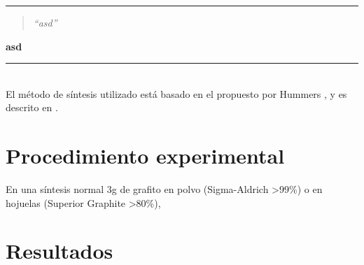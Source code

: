\noindent
\rule{\linewidth}{1 pt}
\begin{flushright}
	\begin{quotation}
		\small{
			\textit{``asd''}}
	\end{quotation}
	\bf{asd}
\end{flushright}
\noindent
\rule{\linewidth}{1 pt}\\
\vfill
El método de síntesis utilizado está basado en el propuesto por Hummers \cite{Hummers1958}, y es descrito en \cite{Abdolhosseinzadeh2015}.
\section{Procedimiento experimental}
En una síntesis normal 3g de grafito en polvo (Sigma-Aldrich >99\%) o en hojuelas (Superior Graphite >80\%), 

\section{Resultados}